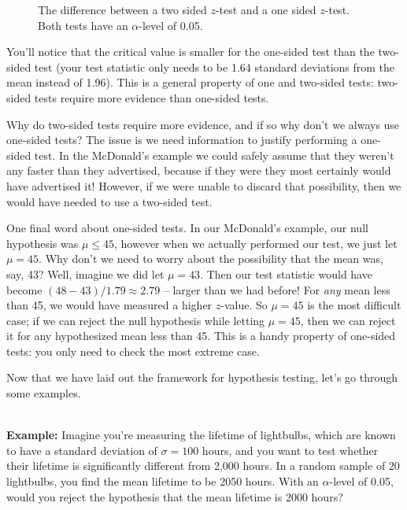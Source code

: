 \begin{figure}[h!]
\begin{center}
\caption{\label{fig:twosidedvonesided}The difference between a two sided $z$-test and a one sided $z$-test.  Both tests have an $\alpha$-level of 0.05.}
\end{center}\end{figure}

You'll notice that the critical value is smaller for the one-sided test than the two-sided test (your test statistic only needs to be 1.64 standard deviations from the mean instead of 1.96). This is a general property of one and two-sided tests: two-sided tests require more evidence than one-sided tests.

Why do two-sided tests require more evidence, and if so why don't we always use one-sided tests? The issue is we need information to justify performing a one-sided test. In the McDonald's example we could safely assume that they weren't any faster than they advertised, because if they were they most certainly would have advertised it!  However, if we were unable to discard that possibility, then we would have needed to use a two-sided test.

One final word about one-sided tests.  In our McDonald's example, our null hypothesis was $\mu \leq 45$, however when we actually performed our test, we just let $\mu = 45$.  Why don't we need to worry about the possibility that the mean was, say, 43?  Well, imagine we did let $\mu = 43$.  Then our test statistic would have become $(48 - 43)/1.79 \approx 2.79$ -- larger than we had before!  For \emph{any} mean less than 45, we would have measured a higher $z$-value.  So $\mu = 45$ is the most difficult case; if we can reject the null hypothesis while letting $\mu = 45$, then we can reject it for any hypothesized mean less than 45.  This is a handy property of one-sided tests: you only need to check the most extreme case.

Now that we have laid out the framework for hypothesis testing, let's go through some examples.

\ \\

\textbf{Example:} \ex Imagine you're measuring the lifetime of lightbulbs, which are known to have a standard deviation of $\sigma=100$ hours, and you want to test whether their lifetime is significantly different from 2,000 hours. In a random sample of 20 lightbulbs, you find the mean lifetime to be 2050 hours. With an $\alpha$-level of 0.05, would you reject the hypothesis that the mean lifetime is 2000 hours?

